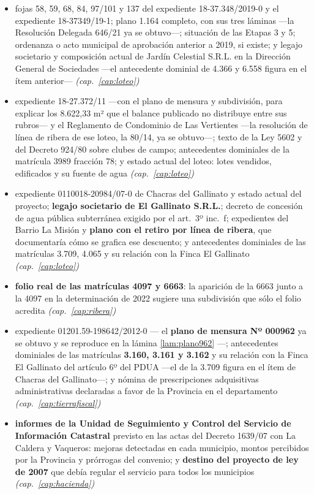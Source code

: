 \begin{itemize}[leftmargin=*]
\item fojas 58, 59, 68, 84, 97/101 y 137 del expediente 18-37.348/2019-0 y el expediente 18-37349/19-1; plano 1.164 completo, con sus tres láminas ---la Resolución Delegada 646/21 ya se obtuvo---; situación de las Etapas 3 y 5; ordenanza o acto municipal de aprobación anterior a 2019, si existe; y legajo societario y composición actual de Jardín Celestial S.R.L. en la Dirección General de Sociedades ---el antecedente dominial de 4.366 y 6.558 figura en el ítem anterior--- \textit{(cap.\ \ref{cap:loteo})}
\item expediente 18-27.372/11 ---con el plano de mensura y subdivisión, para explicar los 8.622,33 m² que el balance publicado no distribuye entre sus rubros--- y el Reglamento de Condominio de Las Vertientes ---la resolución de línea de ribera de ese loteo, la 80/14, ya se obtuvo---; texto de la Ley 5602 y del Decreto 924/80 sobre clubes de campo; antecedentes dominiales de la matrícula 3989 fracción 78; y estado actual del loteo: lotes vendidos, edificados y su fuente de agua \textit{(cap.\ \ref{cap:loteo})}
\item expediente 0110018-20984/07-0 de Chacras del Gallinato y estado actual del proyecto; \textbf{legajo societario de El Gallinato S.R.L.}; decreto de concesión de agua pública subterránea exigido por el art.\ 3º inc.\ f; expedientes del Barrio La Misión y \textbf{plano con el retiro por línea de ribera}, que documentaría cómo se grafica ese descuento; y antecedentes dominiales de las matrículas 3.709, 4.065 y su relación con la Finca El Gallinato \textit{(cap.\ \ref{cap:loteo})}
\item \textbf{folio real de las matrículas 4097 y 6663}: la aparición de la 6663 junto a la 4097 en la determinación de 2022 sugiere una subdivisión que sólo el folio acredita \textit{(cap.\ \ref{cap:ribera})}
\item expediente 01201.59-198642/2012-0 --- el \textbf{plano de mensura Nº 000962} ya se obtuvo y se reproduce en la lámina \ref{lam:plano962} ---; antecedentes dominiales de las matrículas \textbf{3.160, 3.161 y 3.162} y su relación con la Finca El Gallinato del artículo 6º del PDUA ---el de la 3.709 figura en el ítem de Chacras del Gallinato---; y nómina de prescripciones adquisitivas administrativas declaradas a favor de la Provincia en el departamento \textit{(cap.\ \ref{cap:tierrafiscal})}
\item \textbf{informes de la Unidad de Seguimiento y Control del Servicio de Información Catastral} previsto en las actas del Decreto 1639/07 con La Caldera y Vaqueros: mejoras detectadas en cada municipio, montos percibidos por la Provincia y prórrogas del convenio; y \textbf{destino del proyecto de ley de 2007} que debía regular el servicio para todos los municipios \textit{(cap.\ \ref{cap:hacienda})}
\end{itemize}

